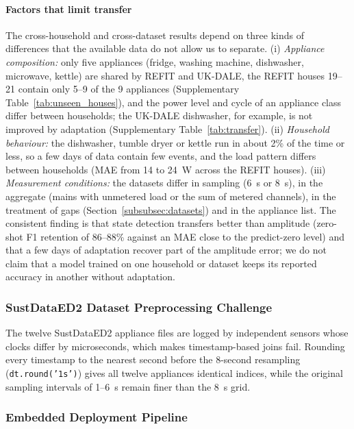 \documentclass[fleqn,10pt]{wlscirep}
\begin{document}
\paragraph{Factors that limit transfer} The cross-household and cross-dataset results depend on three kinds of differences that the available data do not allow us to separate. (i) \textit{Appliance composition:} only five appliances (fridge, washing machine, dishwasher, microwave, kettle) are shared by REFIT and UK-DALE, the REFIT houses 19--21 contain only 5--9 of the 9 appliances (Supplementary Table~\ref{tab:unseen_houses}), and the power level and cycle of an appliance class differ between households; the UK-DALE dishwasher, for example, is not improved by adaptation (Supplementary Table~\ref{tab:transfer}). (ii) \textit{Household behaviour:} the dishwasher, tumble dryer or kettle run in about 2\% of the time or less, so a few days of data contain few events, and the load pattern differs between households (MAE from 14 to 24~W across the REFIT houses). (iii) \textit{Measurement conditions:} the datasets differ in sampling (6~s or 8~s), in the aggregate (mains with unmetered load or the sum of metered channels), in the treatment of gaps (Section~\ref{subsubsec:datasets}) and in the appliance list. The consistent finding is that state detection transfers better than amplitude (zero-shot F1 retention of 86--88\% against an MAE close to the predict-zero level) and that a few days of adaptation recover part of the amplitude error; we do not claim that a model trained on one household or dataset keeps its reported accuracy in another without adaptation.

\subsubsection{SustDataED2 Dataset Preprocessing Challenge}
\label{subsubsec:SustDataED2_preprocessing}

The twelve SustDataED2 appliance files are logged by independent sensors whose clocks differ by microseconds, which makes timestamp-based joins fail. Rounding every timestamp to the nearest second before the 8-second resampling (\texttt{dt.round('1s')}) gives all twelve appliances identical indices, while the original sampling intervals of 1--6~s remain finer than the 8~s grid.

\subsubsection{Embedded Deployment Pipeline}
\label{subsubsec:deployment_details}
\end{document}
